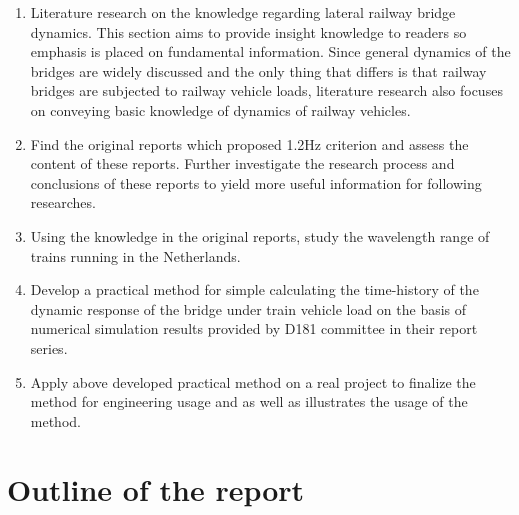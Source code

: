 \begin{enumerate}

\item Literature research on the knowledge regarding lateral railway bridge dynamics. This section aims to provide insight knowledge to readers so emphasis is placed on fundamental information. Since general dynamics of the bridges are widely discussed and the only thing that differs is that railway bridges are subjected to railway vehicle loads, literature research also focuses on conveying basic knowledge of dynamics of railway vehicles.

\item Find the original reports which proposed 1.2Hz criterion and assess the content of these reports. Further investigate the research process and conclusions of these reports to yield more useful information for following researches.

\item Using the knowledge in the original reports, study the wavelength range of trains running in the Netherlands.

\item Develop a practical method for simple calculating the time-history of the dynamic response of the bridge under train vehicle load on the basis of numerical simulation results provided by D181 committee in their report series.

\item Apply above developed practical method on a real project to finalize the method for engineering usage and as well as illustrates the usage of the method.

\end{enumerate}

\section{Outline of the report}


